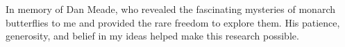 \begin{dedication}

    In memory of Dan Meade, who revealed the fascinating mysteries of monarch butterflies to me and provided the rare freedom to explore them. His patience, generosity, and belief in my ideas helped make this research possible.

\end{dedication}
